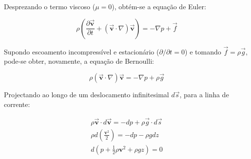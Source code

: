 Desprezando o termo viscoso (\(\mu = 0\)), obtém-se a equação de Euler:

\begin{equation}
    \rho \left( \frac{\partial \vec{\mathbf{v}}}{\partial t} + (\vec{\mathbf{v}} \cdot \nabla) \vec{\mathbf{v}} \right) = -\nabla p + \vec{f}
\end{equation}

Supondo escoamento incompressível e estacionário (\(\partial/\partial t = 0\)) e tomando \(\vec{f} = \rho \vec{g}\), pode-se obter, novamente, a equação de Bernoulli:

\begin{equation*}
    \rho (\vec{\mathbf{v}} \cdot \nabla) \vec{\mathbf{v}} = -\nabla p + \rho \vec{g}
\end{equation*}

Projectando ao longo de um deslocamento infinitesimal \(d\vec{s}\), para a linha de corrente:

\begin{eqnarray*}
    \rho \vec{\mathbf{v}} \cdot d\vec{\mathbf{v}} = -dp + \rho \vec{g} \cdot d\vec{s} \\
    \rho d \left(\frac{\mathbf{v}^2}{2}\right) = -dp - \rho g dz \\
    d \left( p + \frac{1}{2} \rho \mathbf{v}^2 + \rho g z \right) = 0
\end{eqnarray*}